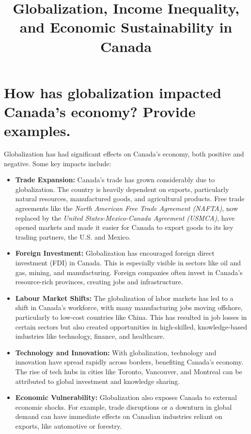 \documentclass{article}
\title{Globalization, Income Inequality, and Economic Sustainability in Canada}
\author{}
\date{}
\begin{document}
\maketitle

\section{How has globalization impacted Canada's economy? Provide examples.}

Globalization has had significant effects on Canada's economy, both positive and negative. Some key impacts include:

\begin{itemize}
    \item \textbf{Trade Expansion:} Canada's trade has grown considerably due to globalization. The country is heavily dependent on exports, particularly natural resources, manufactured goods, and agricultural products. Free trade agreements like the \textit{North American Free Trade Agreement (NAFTA)}, now replaced by the \textit{United States-Mexico-Canada Agreement (USMCA)}, have opened markets and made it easier for Canada to export goods to its key trading partners, the U.S. and Mexico.
    
    \item \textbf{Foreign Investment:} Globalization has encouraged foreign direct investment (FDI) in Canada. This is especially visible in sectors like oil and gas, mining, and manufacturing. Foreign companies often invest in Canada's resource-rich provinces, creating jobs and infrastructure.
    
    \item \textbf{Labour Market Shifts:} The globalization of labor markets has led to a shift in Canada's workforce, with many manufacturing jobs moving offshore, particularly to low-cost countries like China. This has resulted in job losses in certain sectors but also created opportunities in high-skilled, knowledge-based industries like technology, finance, and healthcare.
    
    \item \textbf{Technology and Innovation:} With globalization, technology and innovation have spread rapidly across borders, benefiting Canada's economy. The rise of tech hubs in cities like Toronto, Vancouver, and Montreal can be attributed to global investment and knowledge sharing.
    
    \item \textbf{Economic Vulnerability:} Globalization also exposes Canada to external economic shocks. For example, trade disruptions or a downturn in global demand can have immediate effects on Canadian industries reliant on exports, like automotive or forestry.
\end{itemize}
\end{document}

